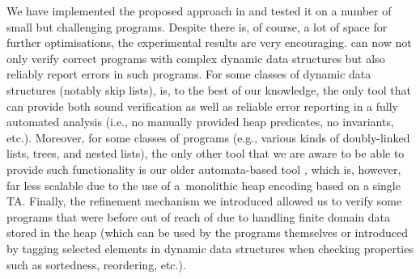 {We have implemented the proposed approach in \forester{} and tested it on a
number of small but challenging programs. Despite there is, of course, a lot of
space for further optimisations, the experimental results are 
% 
%
very encouraging.
%
\forester{} can now not only verify correct programs with complex dynamic data
structures but also reliably report errors in such programs. For some classes of
dynamic data structures (notably skip lists), \forester{} is, to the best of our
knowledge, the only tool that can provide both sound verification as well as
reliable error reporting in a fully automated analysis (i.e., no manually
provided heap predicates, no invariants, etc.). Moreover, for some classes of
programs (e.g., various kinds of doubly-linked lists, trees, and nested lists),
the only other tool that we are aware to be able to provide such functionality
is our older automata-based tool \cite{bhrv06b}, which is, however, far less
scalable due to the use of a~monolithic heap encoding based on a single TA. Finally,
the refinement mechanism we introduced allowed us to verify some programs that
were before out of reach of \forester{} due to handling finite domain data
stored in the heap (which can be used by the programs themselves or introduced
by tagging selected elements in dynamic data structures when checking properties
such as sortedness, reordering, etc.).


}
